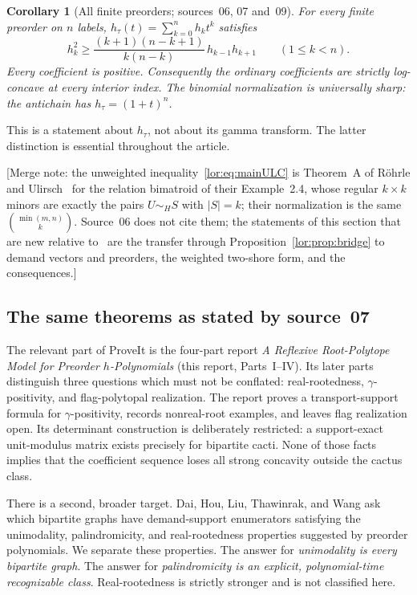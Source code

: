 \documentclass[11pt]{article}
\numberwithin{equation}{section}
\newtheorem{corollary}[theorem]{Corollary}
\theoremstyle{definition}
\begin{document}
\begin{corollary}[All finite preorders; sources~06, 07 and~09]\label{lor:cor:preorderintro}
For every finite preorder on $n$ labels, $h_\tau(t)=\sum_{k=0}^nh_kt^k$
satisfies
\begin{equation}
 h_k^2\ge
 \frac{(k+1)(n-k+1)}{k(n-k)}\,h_{k-1}h_{k+1}
 \qquad(1\le k<n).
 \label{lor:eq:preorderULC}
\end{equation}
Every coefficient is positive. Consequently the ordinary coefficients are
strictly log-concave at every interior index. The binomial normalization
is universally sharp: the antichain has $h_\tau=(1+t)^n$.
\end{corollary}
This is a statement about $h_\tau$, not about its gamma transform. The
latter distinction is essential throughout the article.

[Merge note: the unweighted inequality~\eqref{lor:eq:mainULC} is
Theorem~A of R\"ohrle and Ulirsch~\cite{RU} for the relation bimatroid of
their Example~2.4, whose regular $k\times k$ minors are exactly the pairs
$U\sim_HS$ with $|S|=k$; their normalization is the same $\binom{\min(m,n)}k$.
Source~06 does not cite them; the statements of this section that are new
relative to~\cite{RU} are the transfer through
Proposition~\ref{lor:prop:bridge} to demand vectors and preorders, the
weighted two-shore form, and the consequences.]

\subsection{The same theorems as stated by source~07}
\label{lor:sec:sp:headline}

The relevant part of ProveIt is the four-part report
\emph{A Reflexive Root-Polytope Model for Preorder $h$-Polynomials}
(this report, Parts~I--IV). Its later parts distinguish three questions which must not be
conflated: real-rootedness, $\gamma$-positivity, and flag-polytopal realization.
The report proves a transport-support formula for $\gamma$-positivity, records
nonreal-root examples, and leaves flag realization open. Its determinant
construction is deliberately restricted: a support-exact unit-modulus matrix
exists precisely for bipartite cacti. None of those facts implies that the
coefficient sequence loses all strong concavity outside the cactus class.

There is a second, broader target. Dai, Hou, Liu, Thawinrak, and Wang
\cite[Problem 5.3]{DHLTW} ask which bipartite graphs have demand-support
enumerators satisfying the unimodality, palindromicity, and real-rootedness
properties suggested by preorder polynomials. We separate these properties.
The answer for \emph{unimodality is every bipartite graph}. The answer for
\emph{palindromicity is an explicit, polynomial-time recognizable class}.
Real-rootedness is strictly stronger and is not classified here.
\end{document}
